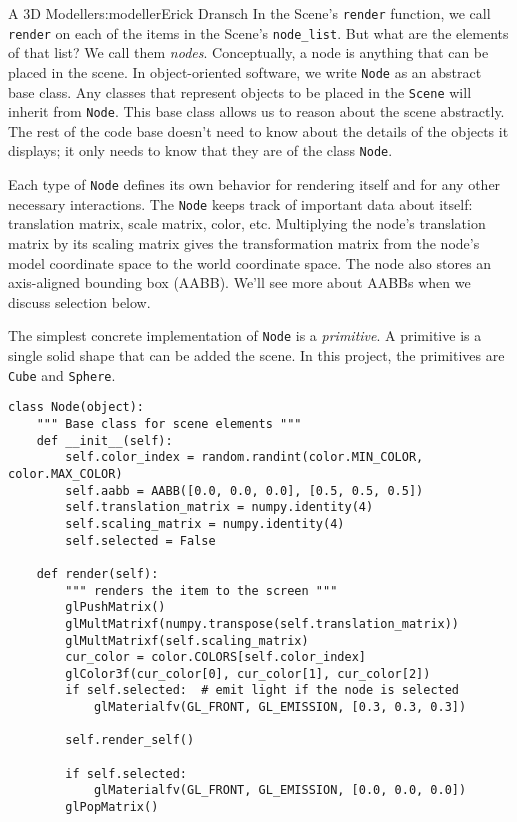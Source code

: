 \begin{aosachapter}{A 3D Modeller}{s:modeller}{Erick Dransch}
In the Scene's \texttt{render} function, we call \texttt{render} on each
of the items in the Scene's \texttt{node\_list}. But what are the
elements of that list? We call them \emph{nodes}. Conceptually, a node
is anything that can be placed in the scene. In object-oriented
software, we write \texttt{Node} as an abstract base class. Any classes
that represent objects to be placed in the \texttt{Scene} will inherit
from \texttt{Node}. This base class allows us to reason about the scene
abstractly. The rest of the code base doesn't need to know about the
details of the objects it displays; it only needs to know that they are
of the class \texttt{Node}.

Each type of \texttt{Node} defines its own behavior for rendering itself
and for any other necessary interactions. The \texttt{Node} keeps track
of important data about itself: translation matrix, scale matrix, color,
etc. Multiplying the node's translation matrix by its scaling matrix
gives the transformation matrix from the node's model coordinate space
to the world coordinate space. The node also stores an axis-aligned
bounding box (AABB). We'll see more about AABBs when we discuss
selection below.

The simplest concrete implementation of \texttt{Node} is a
\emph{primitive}. A primitive is a single solid shape that can be added
the scene. In this project, the primitives are \texttt{Cube} and
\texttt{Sphere}.

\begin{verbatim}
class Node(object):
    """ Base class for scene elements """
    def __init__(self):
        self.color_index = random.randint(color.MIN_COLOR, color.MAX_COLOR)
        self.aabb = AABB([0.0, 0.0, 0.0], [0.5, 0.5, 0.5])
        self.translation_matrix = numpy.identity(4)
        self.scaling_matrix = numpy.identity(4)
        self.selected = False

    def render(self):
        """ renders the item to the screen """
        glPushMatrix()
        glMultMatrixf(numpy.transpose(self.translation_matrix))
        glMultMatrixf(self.scaling_matrix)
        cur_color = color.COLORS[self.color_index]
        glColor3f(cur_color[0], cur_color[1], cur_color[2])
        if self.selected:  # emit light if the node is selected
            glMaterialfv(GL_FRONT, GL_EMISSION, [0.3, 0.3, 0.3])
        
        self.render_self()

        if self.selected:
            glMaterialfv(GL_FRONT, GL_EMISSION, [0.0, 0.0, 0.0])
        glPopMatrix()


\end{verbatim}
\end{aosachapter}
